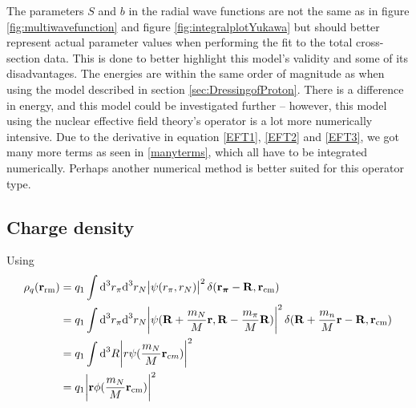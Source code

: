 The parameters $S$ and $b$ in the radial wave functions are not the same as in figure \ref{fig:multiwavefunction} and figure \ref{fig:integralplotYukawa} but should better represent actual parameter values when performing the fit to the total cross-section data. This is done to better highlight this model's validity and some of its disadvantages. The energies are within the same order of magnitude as when using the model described in section \ref{sec:DressingofProton}. There is a difference in energy, and this model could be investigated further -- however, this model using the nuclear effective field theory's operator is a lot more numerically intensive. Due to the derivative in equation \eqref{EFT1}, \eqref{EFT2} and \eqref{EFT3}, we got many more terms as seen in \eqref{manyterms}, which all have to be integrated numerically. Perhaps another numerical method is better suited for this operator type.
\subsection{Charge density}
Using 
\begin{align}
	\rho_q(\bm{\mathrm{r}}_\text{rm}) &= q_1 \int \text{d}^3 r_\pi \text{d}^3 r_N \abs{\psi(r_\pi,r_N)}^2 \delta(\bm{\mathrm{r_\pi}}-\bm{\mathrm{R}},\bm{\mathrm{r}}_\text{cm}) \\
	&= q_1 \int \text{d}^3 r_\pi \text{d}^3 r_N \abs{\psi(\bm{\mathrm{R}}+\frac{m_N}{M}\bm{\mathrm{r}},\bm{\mathrm{R}}-\frac{m_\pi}{M}\bm{\mathrm{R}})}^2 \delta(\bm{\mathrm{R}}+\frac{m_n}{M}\bm{\mathrm{r}}-\bm{\mathrm{R}},\bm{\mathrm{r}}_\text{cm}) \\
	&= q_1 \int \text{d}^3 R \abs{r\psi(\frac{m_N}{M}\bm{\mathrm{r}}_{cm})}^2 \\
	&= q_1 \abs{\bm{\mathrm{r}}\phi(\frac{m_N}{M}\bm{\mathrm{r}}_\text{cm})}^2
\end{align}
